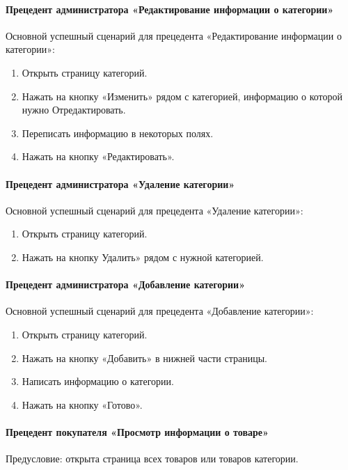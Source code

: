 \paragraph{Прецедент администратора «Редактирование информации о категории»}

Основной успешный сценарий для прецедента «Редактирование информации о категории»:
\begin{enumerate}
	\item Открыть страницу категорий.
	\item Нажать на кнопку «Изменить» рядом с категорией, информацию о которой нужно Отредактировать.
	\item Переписать информацию в некоторых полях.
	\item Нажать на кнопку «Редактировать».
\end{enumerate}

\paragraph{Прецедент администратора «Удаление категории»}

Основной успешный сценарий для прецедента «Удаление категории»:
\begin{enumerate}
	\item Открыть страницу категорий.
	\item Нажать на кнопку Удалить» рядом с нужной категорией.
\end{enumerate}

\paragraph{Прецедент администратора «Добавление категории»}

Основной успешный сценарий для прецедента «Добавление категории»:
\begin{enumerate}
	\item Открыть страницу категорий.
	\item Нажать на кнопку «Добавить» в нижней части страницы.
	\item Написать информацию о категории.
	\item Нажать на кнопку «Готово».
\end{enumerate}


\paragraph{Прецедент покупателя «Просмотр информации о товаре»}
Предусловие: открыта страница всех товаров или товаров категории.

